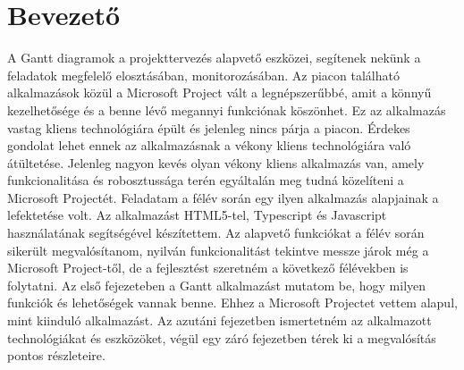 \chapter*{Bevezető}

\hspace{2mm} A Gantt diagramok a projekttervezés alapvető eszközei, segítenek nekünk a feladatok megfelelő elosztásában, monitorozásában. Az piacon található alkalmazások közül a Microsoft Project vált a legnépszerűbbé, amit a könnyű kezelhetősége és a benne lévő megannyi funkciónak köszönhet. Ez az alkalmazás vastag kliens technológiára épült és jelenleg nincs párja a piacon. Érdekes gondolat lehet ennek az alkalmazásnak a vékony kliens technológiára való átültetése. Jelenleg nagyon kevés olyan vékony kliens alkalmazás van, amely funkcionalitása és robosztussága terén egyáltalán meg tudná közelíteni a Microsoft Projectét. Feladatam a félév során egy ilyen alkalmazás alapjainak a lefektetése volt. Az alkalmazást HTML5-tel, Typescript és Javascript használatának segítségével készítettem.\newline
\indent Az alapvető funkciókat a félév során sikerült megvalósítanom, nyilván funkcionalitást tekintve messze járok még a Microsoft Project-től, de a fejlesztést szeretném a következő félévekben is folytatni. Az első fejezeteben a Gantt alkalmazást mutatom be, hogy milyen funkciók és lehetőségek vannak benne. Ehhez a Microsoft Projectet vettem alapul, mint kiinduló alkalmazást. Az azutáni fejezetben ismertetném az alkalmazott technológiákat és eszközöket, végül egy záró fejezetben térek ki a megvalósítás pontos részleteire.